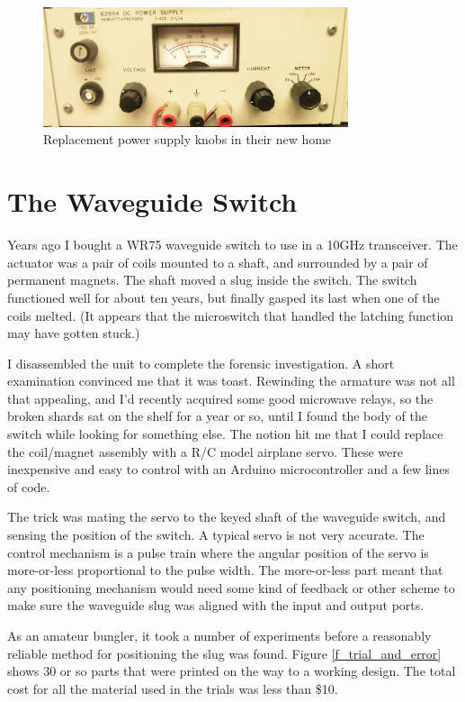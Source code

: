 \documentclass[12pt]{article}
\begin{document}
\begin{figure}[tb]
  \centering
  \includegraphics[width=0.8\textwidth]{PSKnobs.jpg}
  \caption{\label{f_knobs_on_box}Replacement power supply knobs in their new home}
\end{figure}

\section{The Waveguide Switch}

Years ago I bought a WR75 waveguide switch to use in a 10GHz transceiver.
The actuator was a pair of coils mounted to a shaft, and surrounded by
a pair of permanent magnets.  The shaft moved a slug inside the switch.
The switch functioned well for about ten years, but finally gasped its last
when one of the coils melted. (It appears that the microswitch that
handled the latching function may have gotten stuck.)

I disassembled the unit to complete the forensic investigation.  A short
examination convinced me that it was toast.  Rewinding the armature was
not all that appealing, and I'd recently acquired some good microwave relays,
so the broken shards sat on the shelf for a year or so, until I found the body
of the switch while looking for something else. The notion hit me that I
could replace the coil/magnet assembly with a R/C model airplane servo.
These were inexpensive and easy to control with an Arduino microcontroller
and a few lines of code.

The trick was mating the servo to the keyed shaft of the waveguide switch,
and sensing the position of the switch.  A typical servo is not very
accurate. The control mechanism is a pulse train where the angular position
of the servo is more-or-less proportional to the pulse width.  The more-or-less
part meant that any positioning mechanism would need some kind of feedback
or other scheme to make sure the waveguide slug was aligned with the input
and output ports.

As an amateur bungler, it took a number of experiments before a reasonably
reliable method for positioning the slug was found. Figure \ref{f_trial_and_error} shows 30 or so parts that were printed on the way to a working design.
The total cost for all the material used in the trials was less than \$10.
\end{document}
